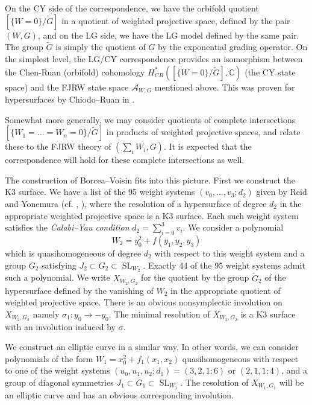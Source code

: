 \documentclass[10pt, letterpaper]{amsart}
\theoremstyle{remark}
\newcommand{\CC}{\mathbb C}
\newcommand{\sA}{\mathscr{A}}
\DeclareMathOperator{\SL}{SL}
\begin{document}
On the CY side of the correspondence, we have the orbifold quotient $[\{W = 0\}/\widetilde{G}]$ in a quotient of weighted projective space, defined by the pair $(W,G)$, and on the LG side, we have the LG model defined by the same pair. The group $\widetilde{G}$ is simply the quotient of $G$ by the exponential grading operator. On the simplest level, the LG/CY correspondence provides an isomorphism between the Chen-Ruan (orbifold) cohomology $H^*_{CR}([\{W = 0\}/\widetilde{G}], \CC)$ (the CY state space) and the FJRW state space $\sA_{W,G}$ mentioned above. This was proven for hypersurfaces by Chiodo--Ruan in \cite{ChR}. 

Somewhat more generally, we may consider quotients of complete intersections $[\{W_1 = \ldots = W_n = 0\}/\widetilde G]$ in products of weighted projective spaces, and relate these to the FJRW theory of $(\sum_i W_i, G)$. It is expected that the correspondence will hold for these complete intersections as well. 

The construction of Borcea--Voisin fits into this picture. First we construct the K3 surface. We have a list of the 95 weight systems $(v_0,\dots,v_3;d_2)$ given by Reid and Yonemura (cf. \cite{Re}, \cite{Yo}), where the resolution of a hypersurface of degree $d_2$ in the appropriate weighted projective space is a K3 surface. Each such weight system satisfies the \emph{Calabi--Yau condition} $d_2=\sum_{i=0}^3 v_i$. We consider a polynomial 
\begin{equation}\label{e:Wform}
W_2=y_0^2+f(y_1,y_2,y_3) 
\end{equation}
which is quasihomogeneous of degree $d_2$ with respect to this weight system and a group $G_2$ satisfying $J_2\subset G_2\subset \SL_{W_2}$. Exactly 44 of the 95 weight systems admit such a polynomial. We write $X_{W_2,G_2}$ for the quotient by the group $\widetilde{G}_2$ of the hypersurface defined by the vanishing of $W_2$ in the appropriate quotient of weighted projective space. There is an obvious nonsymplectic involution on $X_{W_2,G_2}$ namely $\sigma_1:y_0\to -y_0$. The minimal resolution of $X_{W_2,G_2}$ is a K3 surface with an involution induced by $\sigma$. 

We construct an elliptic curve in a similar way. In other words, we can consider polynomials of the form $W_1=x_0^2+f_1(x_1,x_2)$ quasihomogeneous with respect to one of the weight systems $(u_0,u_1,u_2;d_1)=(3,2,1;6)$ or $(2,1,1;4)$, and a group of diagonal symmetries $J_1\subset G_1\subset \SL_{W_1}$. The resolution of $X_{W_1,G_1}$ will be an elliptic curve and has an obvious corresponding involution. 
\end{document}
